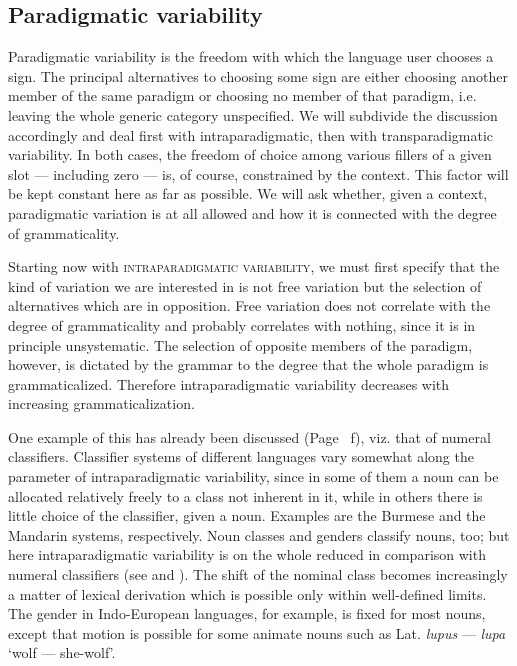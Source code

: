 \subsection{Paradigmatic variability} \label{sec:4.2.3}

Paradigmatic variability is the freedom with which the language user chooses a sign. The principal alternatives to choosing some sign are either choosing another member of the same paradigm or choosing no member of that paradigm, i.e. leaving the whole generic category unspecified. We will subdivide the discussion accordingly and deal first with intraparadigmatic, then with transparadigmatic variability. In both cases, the freedom of choice among various fillers of a given slot — including zero — is, of course, constrained by the context. This factor will be kept constant here as far as possible. We will ask whether, given a context, paradigmatic variation is at all allowed and how it is connected with the degree of grammaticality.

Starting now with \textsc{intraparadigmatic variability}, we must first specify that the kind of variation we are interested in is not free variation but the selection of alternatives which are in opposition. Free variation does not correlate with the degree of grammaticality and probably correlates with nothing, since it is in principle unsystematic. The selection of opposite members of the paradigm, however, is dictated by the grammar to the degree that the whole paradigm is grammaticalized. Therefore intraparadigmatic variability decreases with increasing grammaticalization.

One example of this has already been discussed (Page~\pageref{page65}\chk%
f), viz. that of numeral classifiers. Classifier systems of different languages vary somewhat along the parameter of intraparadigmatic variability, since in some of them a noun can be allocated relatively freely to a class not inherent in it, while in others there is little choice of the classifier, given a noun. Examples are the Burmese and the Mandarin systems, respectively. Noun classes and genders classify nouns, too; but here intraparadigmatic variability is on the whole reduced in comparison with numeral classifiers (see \citealt{Serzisko1981} and \citealt[§~6.3]{Lehmann1982b}). The shift of the nominal class becomes increasingly a matter of lexical derivation which is possible only within well-defined limits. The gender in Indo-European languages, for example, is fixed for most nouns, except that motion is possible for some animate nouns such as Lat. \textit{lupus} — \textit{lupa} ‘wolf — she-wolf’.

